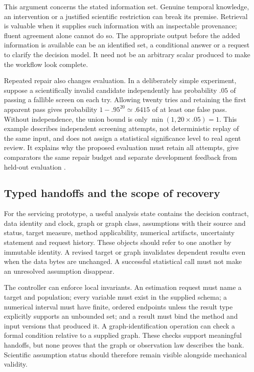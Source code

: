 This argument concerns the stated information set. Genuine temporal knowledge,
an intervention or a justified scientific restriction can break its premise.
Retrieval is valuable when it supplies such information with an inspectable
provenance; fluent agreement alone cannot do so. The appropriate output before
the added information is available can be an identified set, a conditional
answer or a request to clarify the decision model. It need not be an arbitrary
scalar produced to make the workflow look complete.

Repeated repair also changes evaluation. In a deliberately simple experiment,
suppose a scientifically invalid candidate independently has probability $.05$
of passing a fallible screen on each try. Allowing twenty tries and retaining
the first apparent pass gives probability
$1-.95^{20}\simeq.6415$ of at least one false pass. Without independence, the
union bound is only $\min(1,20\times.05)=1$. This example describes independent
screening attempts, not deterministic replay of the same input, and does not
assign a statistical significance level to real agent review. It explains why
the proposed evaluation must retain all attempts, give comparators the same
repair budget and separate development feedback from held-out evaluation
\cite{exec13_architecture_exact}.

\subsection{Typed handoffs and the scope of recovery}

For the servicing prototype, a useful analysis state contains the decision
contract, data identity and clock, graph or graph class, assumptions with their
source and status, target measure, method applicability, numerical artifacts,
uncertainty statement and request history. These objects should refer to one
another by immutable identity. A revised target or graph invalidates dependent
results even when the data bytes are unchanged. A successful statistical call
must not make an unresolved assumption disappear.

The controller can enforce local invariants. An estimation request must name a
target and population; every variable must exist in the supplied schema; a
numerical interval must have finite, ordered endpoints unless the result type
explicitly supports an unbounded set; and a result must bind the method and
input versions that produced it. A graph-identification operation can check a
formal condition relative to a supplied graph. These checks support meaningful
handoffs, but none proves that the graph or observation law describes the bank.
Scientific assumption status should therefore remain visible alongside
mechanical validity.


